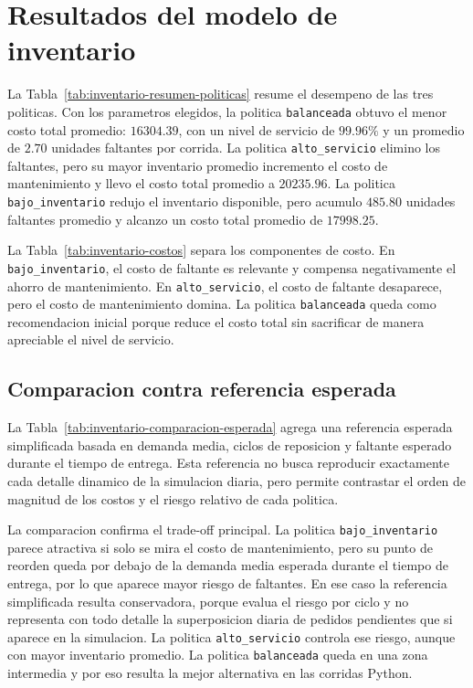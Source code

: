 \section{Resultados del modelo de inventario}

La Tabla~\ref{tab:inventario-resumen-politicas} resume el desempeno de las tres politicas. Con los parametros elegidos, la politica \texttt{balanceada} obtuvo el menor costo total promedio: $16304.39$, con un nivel de servicio de $99.96\%$ y un promedio de $2.70$ unidades faltantes por corrida. La politica \texttt{alto\_servicio} elimino los faltantes, pero su mayor inventario promedio incremento el costo de mantenimiento y llevo el costo total promedio a $20235.96$. La politica \texttt{bajo\_inventario} redujo el inventario disponible, pero acumulo $485.80$ unidades faltantes promedio y alcanzo un costo total promedio de $17998.25$.



La Tabla~\ref{tab:inventario-costos} separa los componentes de costo. En \texttt{bajo\_inventario}, el costo de faltante es relevante y compensa negativamente el ahorro de mantenimiento. En \texttt{alto\_servicio}, el costo de faltante desaparece, pero el costo de mantenimiento domina. La politica \texttt{balanceada} queda como recomendacion inicial porque reduce el costo total sin sacrificar de manera apreciable el nivel de servicio.



\subsection{Comparacion contra referencia esperada}

La Tabla~\ref{tab:inventario-comparacion-esperada} agrega una referencia esperada simplificada basada en demanda media, ciclos de reposicion y faltante esperado durante el tiempo de entrega. Esta referencia no busca reproducir exactamente cada detalle dinamico de la simulacion diaria, pero permite contrastar el orden de magnitud de los costos y el riesgo relativo de cada politica.



La comparacion confirma el trade-off principal. La politica \texttt{bajo\_inventario} parece atractiva si solo se mira el costo de mantenimiento, pero su punto de reorden queda por debajo de la demanda media esperada durante el tiempo de entrega, por lo que aparece mayor riesgo de faltantes. En ese caso la referencia simplificada resulta conservadora, porque evalua el riesgo por ciclo y no representa con todo detalle la superposicion diaria de pedidos pendientes que si aparece en la simulacion. La politica \texttt{alto\_servicio} controla ese riesgo, aunque con mayor inventario promedio. La politica \texttt{balanceada} queda en una zona intermedia y por eso resulta la mejor alternativa en las corridas Python.

